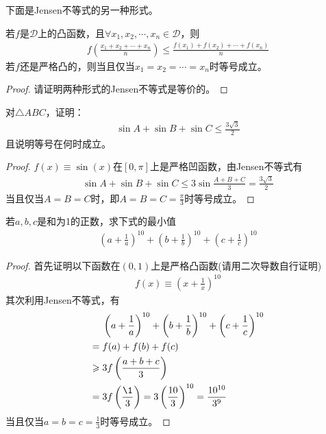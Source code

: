 下面是Jensen不等式的另一种形式。
\begin{theorem}[Jensen不等式]
  若$f$是$\mathcal{D}$上的凸函数，且$\forall x_1,x_2,\cdots,x_n\in\mathcal{D}$，则
  \begin{align}
    f\left(\frac{x_1+x_2+\cdots+x_n}{n}\right)\le\frac{f(x_1)+f(x_2)+\cdots+f(x_n)}{n}
  \end{align}
  若$f$还是严格凸的，则当且仅当$x_1=x_2=\cdots=x_n$时等号成立。
\end{theorem}

\begin{proof}
  {\color{red}请证明两种形式的Jensen不等式是等价的。}
\end{proof}

\begin{example}
  对$\triangle ABC$，证明：
  \begin{align*}
    \sin A + \sin B + \sin C \le \frac{3\sqrt3}{2}
  \end{align*}
  且说明等号在何时成立。
\end{example}

\begin{proof}
  $f(x)\equiv\sin(x)$在$[0,\pi]$上是严格凹函数，由Jensen不等式有
  \begin{align*}
    \sin A + \sin B + \sin C \le 3\sin\frac{A+B+C}{3} = \frac{3\sqrt3}{2}
  \end{align*}
  当且仅当$A=B=C$时，即$A=B=C=\frac\pi3$时等号成立。
\end{proof}

\begin{example}
  若$a,b,c$是和为1的正数，求下式的最小值
  \begin{align*}
    \left(a+\frac1a\right)^{10} + 
    \left(b+\frac1b\right)^{10} + 
    \left(c+\frac1c\right)^{10}
  \end{align*}
\end{example}

\begin{proof}
  首先证明以下函数在$(0,1)$上是严格凸函数({\color{red}请用二次导数自行证明})
  \begin{align*}
    f(x)\equiv\left(x+\frac1x\right)^{10}
  \end{align*}
  其次利用Jensen不等式，有
  \begin{align*}
    &\left(a+\frac1a\right)^{10} + 
    \left(b+\frac1b\right)^{10} + 
    \left(c+\frac1c\right)^{10}\\
    ={}  & f(a) + f(b) + f(c)\\
    \ge{}& 3f\left(\frac{a+b+c}3\right)\\
    ={}  & 3f\left(\frac\13\right) = 3 \left(\frac{10}{3}\right)^{10} = \frac{10^{10}}{3^9}
  \end{align*}
  当且仅当$a=b=c=\frac13$时等号成立。
\end{proof}